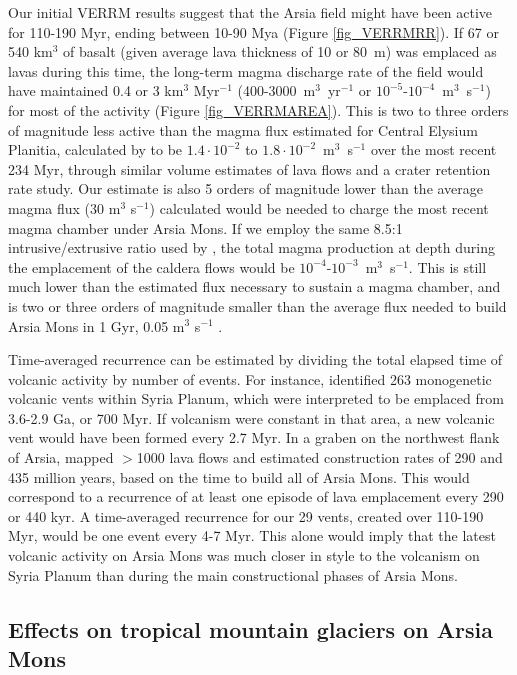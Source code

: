 \documentclass[12pt,letter]{article}
\begin{document}
Our initial VERRM results suggest that the Arsia field might have been active for 110-190 Myr, ending between 10-90 Mya (Figure \ref{fig_VERRMRR}). If 67 or 540 km$^3$ of basalt (given average lava thickness of 10 or 80~m) was emplaced as lavas during this time, the long-term magma discharge rate of the field would have maintained 0.4 or 3 km$^3$ Myr$^{-1}$ (400-3000~m$^3$~yr$^{-1}$ or $10^{-5}$-$10^{-4}$~m$^3$~s$^{-1}$) for most of the activity (Figure \ref{fig_VERRMAREA}). This is two to three orders of magnitude less active than the magma flux estimated for Central Elysium Planitia, calculated by \citet{vaucher2009volcanic} to be $1.4\cdot 10^{-2}$ to $1.8\cdot 10^{-2}$~m$^3$~s$^{-1}$ over the most recent 234 Myr, through similar volume estimates of lava flows and a crater retention rate study. Our estimate is also 5 orders of magnitude lower than the average magma flux (30 m$^3$ s$^{-1}$) \citet{wilson2001evidence} calculated would be needed to charge the most recent magma chamber under Arsia Mons. If we employ the same 8.5:1 intrusive/extrusive ratio used by \citet{greeley1991magma}, the total magma production at depth during the emplacement of the caldera flows would be $10^{-4}$-$10^{-3}$~m$^3$~s$^{-1}$. This is still much lower than the estimated flux necessary to sustain a magma chamber, and is two or three orders of magnitude smaller than the average flux needed to build Arsia Mons in 1 Gyr, 0.05 m$^3$ s$^{-1}$ \citep{wilson2001evidence}.

Time-averaged recurrence can be estimated by dividing the total elapsed time of volcanic activity by number of events. For instance, \citet{richardson2013volcanic} identified 263 monogenetic volcanic vents within Syria Planum, which were interpreted to be emplaced from 3.6-2.9 Ga, or 700 Myr. If volcanism were constant in that area, a new volcanic vent would have been formed every 2.7 Myr. In a graben on the northwest flank of Arsia, \citet{mouginis2008lava} mapped $>$1000 lava flows and estimated construction rates of 290 and 435 million years, based on the time to build all of Arsia Mons. This would correspond to a recurrence of at least one episode of lava emplacement every 290 or 440 kyr. A time-averaged recurrence for our 29 vents, created over 110-190 Myr, would be one event every 4-7 Myr. This alone would imply that the latest volcanic activity on Arsia Mons was much closer in style to the volcanism on Syria Planum than during the main constructional phases of Arsia Mons.

\subsection{Effects on tropical mountain glaciers on Arsia Mons}
\end{document}
